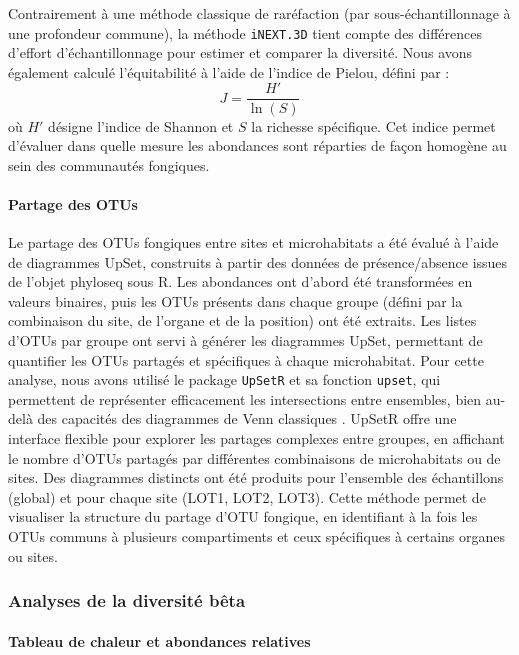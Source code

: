 \documentclass[a4paper,12pt]{article}
\begin{document}
Contrairement à une méthode classique de raréfaction (par sous-échantillonnage à une profondeur commune), la méthode \texttt{iNEXT.3D} tient compte des différences d’effort d’échantillonnage pour estimer et comparer la diversité. Nous avons également calculé l’équitabilité à l’aide de l’indice de Pielou, défini par : 
\[
J = \frac{H'}{\ln(S)}
\]
où \(H'\) désigne l’indice de Shannon et \(S\) la richesse spécifique. Cet indice permet d’évaluer dans quelle mesure les abondances sont réparties de façon homogène au sein des communautés fongiques.

\paragraph{Partage des OTUs }



Le partage des OTUs fongiques entre sites et microhabitats a été évalué à l’aide de diagrammes UpSet, construits à partir des données de présence/absence issues de l’objet phyloseq sous R. Les abondances ont d’abord été transformées en valeurs binaires, puis les OTUs présents dans chaque groupe (défini par la combinaison du site, de l’organe et de la position) ont été extraits. Les listes d’OTUs par groupe ont servi à générer les diagrammes UpSet, permettant de quantifier les OTUs partagés et spécifiques à chaque microhabitat. Pour cette analyse, nous avons utilisé le package \texttt{UpSetR} et sa fonction \texttt{upset}, qui permettent de représenter efficacement les intersections entre ensembles, bien au-delà des capacités des diagrammes de Venn classiques \citep{lex2014upset}. UpSetR offre une interface flexible pour explorer les partages complexes entre groupes, en affichant le nombre d’OTUs partagés par différentes combinaisons de microhabitats ou de sites. Des diagrammes distincts ont été produits pour l’ensemble des échantillons (global) et pour chaque site (LOT1, LOT2, LOT3). Cette méthode permet de visualiser la structure du partage d’OTU fongique, en identifiant à la fois les OTUs communs à plusieurs compartiments et ceux spécifiques à certains organes ou sites.





\subsubsection{Analyses de la diversité bêta}

\paragraph{Tableau de chaleur et abondances relatives}
\end{document}
